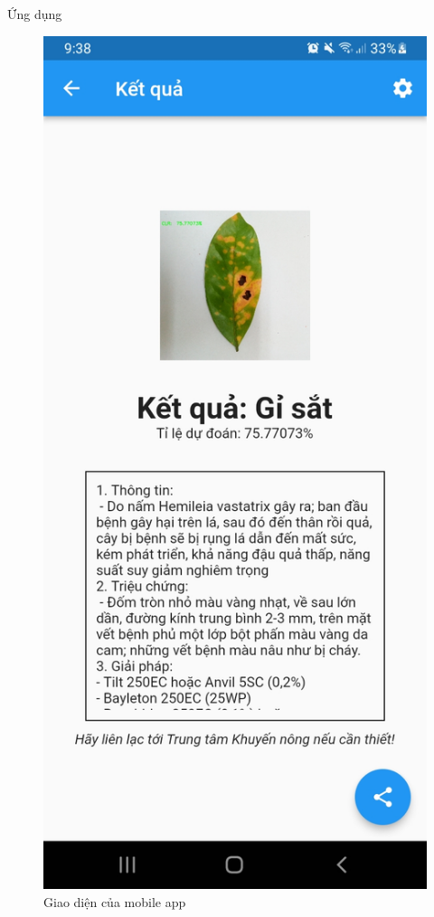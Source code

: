 \documentclass{beamer}
\begin{document}
\begin{frame}[allowframebreaks]{Ứng dụng}
\begin{figure}[H]
		\includegraphics[scale=0.1]{images/screenshot4.jpg}
		\caption{Giao diện của mobile app}
	\end{figure}

	\framebreak


\end{frame}
\end{document}
